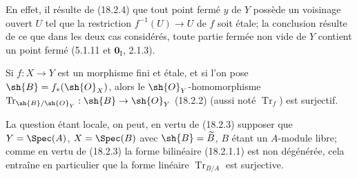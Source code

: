 En effet, il résulte de (18.2.4) que tout point fermé $y$ de $Y$ possède un voisinage ouvert $U$ tel que la restriction $f^{-1}(U)\to U$ de $f$ soit étale; la conclusion résulte de ce que dans les deux cas considérés, toute partie fermée non vide de $Y$ contient un point fermé (5.1.11 et $\mathbf{0}_{\mathrm I}$, 2.1.3).

\begin{corollary}[18.2.6]
\label{IV.18.2.6}
Si $f:X\to Y$ est un morphisme fini et étale, et si l'on pose $\sh{B}=f_*(\sh{O}_X)$, alors le $\sh{O}_Y$-homomorphisme $\operatorname{Tr}_{\sh{B}/\sh{O}_Y}:\sh{B}\to\sh{O}_Y$ \textup{(18.2.2) (aussi noté $\operatorname{Tr}_f$)} est surjectif.
\end{corollary}

La question étant locale, on peut, en vertu de (18.2.3) supposer que $Y=\Spec(A)$, $X=\Spec(B)$ avec $\sh{B}=\widetilde B$, $B$ étant un $A$-module libre; comme en vertu de (18.2.3) la forme bilinéaire (18.2.1.1) est non dégénérée, cela entraîne en particulier que la forme linéaire $\operatorname{Tr}_{B/A}$ est surjective.

